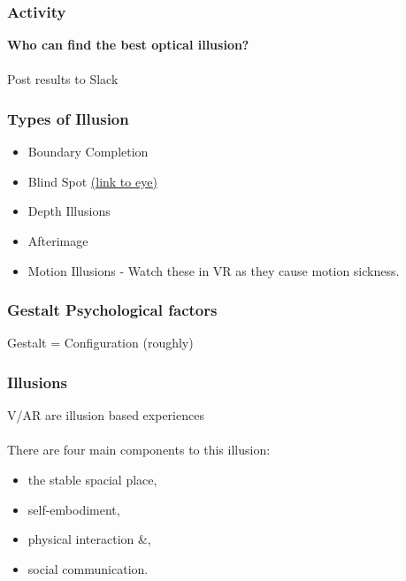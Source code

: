 \begin{frame}
	\frametitle{Activity}
	\textbf{Who can find the best optical illusion?} \\~\\
	
	Post results to Slack
	
\end{frame}

\begin{frame}
	\frametitle{Types of Illusion}
	\begin{itemize}
		\item Boundary Completion
		\item Blind Spot \href{http://snowbrains.com/wp-content/uploads/2013/07/eyeball.jpg}{ (link to eye)}
		\item Depth Illusions
		\item Afterimage
		\item Motion Illusions - Watch these in VR as they cause motion sickness. 
	\end{itemize}
\end{frame}

\begin{frame}
	\frametitle{Gestalt Psychological factors}
	Gestalt = Configuration (roughly)
\end{frame}

\begin{frame}
	\frametitle{Illusions}
	V/AR are illusion based experiences \\~\\ 
	
	There are four main components to this illusion:
	\begin{itemize}
		\item the stable spacial place,
		\item self-embodiment,
		\item physical interaction \&,
		\item social communication.
	\end{itemize}
\end{frame}


